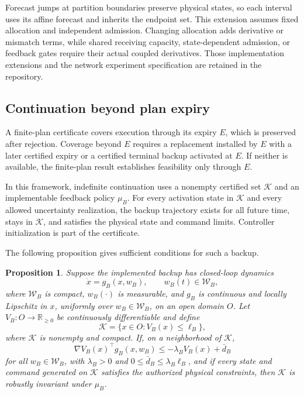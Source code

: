 \documentclass[preprint,12pt]{elsarticle}
\newtheorem{proposition}{Proposition}
\begin{document}
Forecast jumps at partition boundaries preserve physical states, so each
interval uses its affine forecast and inherits the endpoint set. This
extension assumes fixed allocation and independent admission. Changing
allocation adds derivative or mismatch terms, while shared receiving
capacity, state-dependent admission, or feedback gates require their actual
coupled derivatives. Those implementation extensions and the network
experiment specification are retained in the repository.

\subsection{Continuation beyond plan expiry}
\label{sec:terminal-backup-main}
\label{sec:terminal-backup}

A finite-plan certificate covers execution through its expiry $E$, which
is preserved after rejection. Coverage beyond $E$ requires a replacement
installed by $E$ with a later certified expiry or a certified terminal
backup activated at $E$. If neither is available, the finite-plan result
establishes feasibility only through $E$.

In this framework, indefinite continuation uses a nonempty certified set
$\mathcal K$ and an implementable feedback policy $\mu_B$. For every
activation state in $\mathcal K$ and every allowed uncertainty realization,
the backup trajectory exists for all future time, stays in $\mathcal K$,
and satisfies the physical state and command limits. Controller
initialization is part of the certificate.

The following proposition gives sufficient conditions for such a backup.

\begin{proposition}
\label{prop:backup-lyapunov}
Suppose the implemented backup has closed-loop dynamics
\[
\dot x=g_B(x,w_B),\qquad w_B(t)\in\mathcal W_B,
\]
where $\mathcal W_B$ is compact, $w_B(\cdot)$ is measurable, and $g_B$ is
continuous and locally Lipschitz in $x$, uniformly over
$w_B\in\mathcal W_B$, on an open domain $O$. Let
$V_B:O\rightarrow\mathbb R_{\ge0}$ be continuously differentiable and define
\[
\mathcal K=\{x\in O:V_B(x)\le\ell_B\},
\]
where $\mathcal K$ is nonempty and compact. If, on a neighborhood of
$\mathcal K$,
\[
\nabla V_B(x)^\top g_B(x,w_B)
\le -\lambda_B V_B(x)+\bar d_B
\]
for all $w_B\in\mathcal W_B$, with
$\lambda_B>0$ and
$0\le\bar d_B\le\lambda_B\ell_B$, and if every state and command generated
on $\mathcal K$ satisfies the authorized physical constraints, then
$\mathcal K$ is robustly invariant under $\mu_B$.
\end{proposition}
\end{document}
